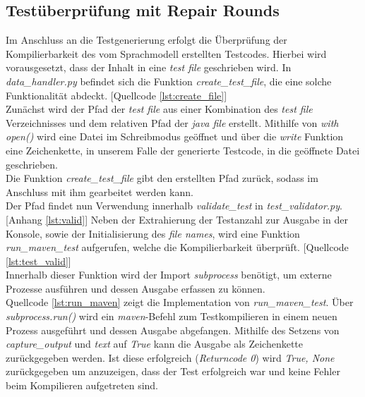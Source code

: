 \subsection{Testüberprüfung mit Repair Rounds}
Im Anschluss an die Testgenerierung erfolgt die Überprüfung der Kompilierbarkeit des vom Sprachmodell erstellten Testcodes. Hierbei wird vorausgesetzt, dass der Inhalt in eine \textit{test file} geschrieben wird. In \textit{data\_handler.py} befindet sich die Funktion \textit{create\_test\_file}, die eine solche Funktionalität abdeckt. [Quellcode \ref{lst:create_file}]\\
Zunächst wird der Pfad der \textit{test file} aus einer Kombination des \textit{test file} Verzeichnisses und dem relativen Pfad der \textit{java file} erstellt. Mithilfe von \textit{with open()} wird eine Datei im Schreibmodus geöffnet und über die \textit{write} Funktion eine Zeichenkette, in unserem Falle der generierte Testcode, in die geöffnete Datei geschrieben. \\Die Funktion \textit{create\_test\_file} gibt den erstellten Pfad zurück, sodass im Anschluss mit ihm gearbeitet werden kann.\\[0.4cm] 
\vspace{-.3cm}
Der Pfad findet nun Verwendung innerhalb \textit{validate\_test} in \textit{test\_validator.py}. [Anhang \ref{lst:valid}] Neben der Extrahierung der Testanzahl zur Ausgabe in der Konsole, sowie der Initialisierung des \textit{file names}, wird eine Funktion \textit{run\_maven\_test} aufgerufen, welche die Kompilierbarkeit überprüft. [Quellcode \ref{lst:test_valid}] \\Innerhalb dieser Funktion wird der Import \textit{subprocess} benötigt, um externe Prozesse ausführen und dessen Ausgabe erfassen zu können. \\
\vspace{-.3cm}
Quellcode \ref{lst:run_maven} zeigt die Implementation von \textit{run\_maven\_test}. Über \textit{subprocess.run()} wird ein \textit{maven}-Befehl zum Testkompilieren in einem neuen Prozess ausgeführt und dessen Ausgabe abgefangen.
Mithilfe des Setzens von \textit{capture\_output} und \textit{text} auf \textit{True} kann die Ausgabe als Zeichenkette zurückgegeben werden. Ist diese erfolgreich (\textit{Returncode 0}) wird \textit{True, None} zurückgegeben um anzuzeigen, dass der Test erfolgreich war und keine Fehler beim Kompilieren aufgetreten sind.\\
